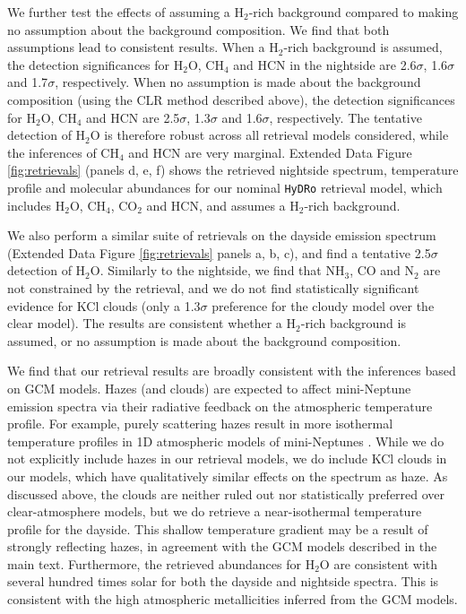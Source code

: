 \documentclass[pdflatex,sn-standardnature]{sn-jnl}%
\begin{document}
We further test the effects of assuming a H$_2$-rich background compared to making no assumption about the background composition. We find that both assumptions lead to consistent results. When a H$_2$-rich background is assumed, the detection significances for H$_2$O, CH$_4$ and HCN in the nightside are 2.6$\sigma$, 1.6$\sigma$ and 1.7$\sigma$, respectively. When no assumption is made about the background composition (using the CLR method described above), the detection significances for H$_2$O, CH$_4$ and HCN are 2.5$\sigma$, 1.3$\sigma$ and 1.6$\sigma$, respectively. The tentative detection of H$_2$O is therefore robust across all retrieval models considered, while the inferences of CH$_4$ and HCN are very marginal. Extended Data Figure \ref{fig:retrievals} (panels d, e, f) shows the retrieved nightside spectrum, temperature profile and molecular abundances for our nominal \texttt{HyDRo} retrieval model, which includes H$_2$O, CH$_4$, CO$_2$ and HCN, and assumes a H$_2$-rich background.

We also perform a similar suite of retrievals on the dayside emission spectrum (Extended Data Figure \ref{fig:retrievals} panels a, b, c), and find a tentative 2.5$\sigma$ detection of H$_2$O. Similarly to the nightside, we find that NH$_3$, CO and N$_2$ are not constrained by the retrieval, and we do not find statistically significant evidence for KCl clouds (only a 1.3$\sigma$ preference for the cloudy model over the clear model). The results are consistent whether a H$_2$-rich background is assumed, or no assumption is made about the background composition.

We find that our retrieval results are broadly consistent with the inferences based on GCM models. Hazes (and clouds) are expected to affect mini-Neptune emission spectra via their radiative feedback on the atmospheric temperature profile. For example, purely scattering hazes result in more isothermal temperature profiles in 1D atmospheric models of mini-Neptunes \citep{piette20_MN}. While we do not explicitly include hazes in our retrieval models, we do include KCl clouds in our models, which have qualitatively similar effects on the spectrum as haze.  As discussed above, the clouds are neither ruled out nor statistically preferred over clear-atmosphere models, but we do retrieve a near-isothermal temperature profile for the dayside. This shallow temperature gradient may be a result of strongly reflecting hazes, in agreement with the GCM models described in the main text. Furthermore, the retrieved abundances for H$_2$O are consistent with several hundred times solar for both the dayside and nightside spectra. This is consistent with the high atmospheric metallicities inferred from the GCM models.
\end{document}
